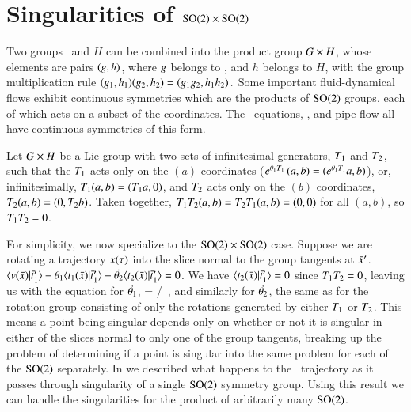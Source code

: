 \documentclass[preprint,12pt]{elsarticle} %
\begin{document}
\section{Singularities of $\textrm{SO}(2) \times \textrm{SO}(2)$}
	\label{sec:singulProd}

Two groups \Group\ and $H$ can be combined into the {product group}
$G \times H$, whose elements are pairs $(g,h)$, where $g$
belongs to \Group, and $h$ belongs to $H$, with the group multiplication
rule
\(
(g_1,h_1)(g_2,h_2)=(g_1 g_2,h_1 h_2)
\,.
\)
Some important fluid-dynamical flows exhibit continuous symmetries which
are the products of $\textrm{SO}(2)$ groups, each of which acts on a subset  of
the {\statesp} coordinates. The \KS\ equations,
{\pCf}, and pipe
flow all have continuous symmetries of this form.

Let $G \times H$ be a Lie group with two sets of infinitesimal
generators, $T_1$ and $T_2$, such that the $T_1$ acts only on the
$(a)$ coordinates ($e^{{\bf \theta}_1 T_1} \,
(a,b)=(e^{{\bf \theta}_1T_1}a,b)$), or, infinitesimally,
$T_1(a,b)=(T_1 a,0)$, and $T_2$ acts only on the $(b)$ coordinates,
$T_2(a,b)=(0,T_2 b)$. Taken together, $T_1 T_2(a,b) = T_2
T_1(a,b) = (0,0) $ for all $(a,b)$, so $T_1 T_2=0$.

For simplicity, we now specialize to the  $\textrm{SO}(2) \times \textrm{SO}(2)$ case.
Suppose we are rotating a trajectory $x(\tau)$ into the slice normal
to the group tangents at $\bar{x}'$. 
$\braket{\vel(\sspRed)}{\sliceTan{1}}-\dot{\gSpace_1} \braket{
\groupTan_1(\sspRed)}{\sliceTan{1}}-\dot{\gSpace_2} \braket{
\groupTan_2(\sspRed)}{\sliceTan{1}}=0$. We have
$\braket{\groupTan_2(\sspRed)}{\sliceTan{1}}=0$ since $T_1 T_2=0$,
leaving us with the equation for $\dot{{\bf \theta}_1}$,
\beq
{}=     {} /
                     {}
\,,
\eeq
and similarly for $\dot{{\bf \theta}_2}$, the same as 
for the rotation group consisting of only the rotations generated by
either $T_1$ or $T_2$.  This means a point being singular depends
only on whether or not it is singular in either of the slices normal to
only one of the group tangents, breaking up the problem of determining if
a point is singular into the same problem for each of the $\textrm{SO}(2)$
separately. In  we described what happens to the
\reducedsp\ trajectory as it passes through singularity of a single
$\textrm{SO}(2)$ symmetry group. Using this result we can handle the
singularities for the product of arbitrarily many $\textrm{SO}(2)$.



\end{document}
